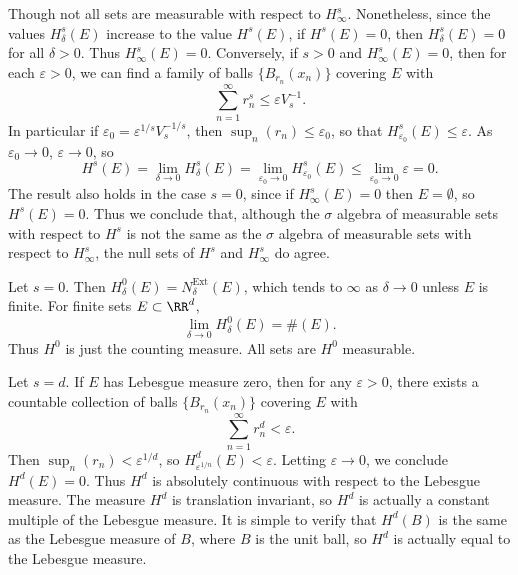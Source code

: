 \begin{remark}
	Though not all sets are measurable with respect to $H^s_\infty$. Nonetheless, since the values $H^s_\delta(E)$ increase to the value $H^s(E)$, if $H^s(E) = 0$, then $H^s_\delta(E) = 0$ for all $\delta > 0$. Thus $H^s_\infty(E) = 0$. Conversely, if $s > 0$ and $H^s_\infty(E) = 0$, then for each $\varepsilon > 0$, we can find a family of balls $\{ B_{r_n}(x_n) \}$ covering $E$ with
	\[ \sum_{n = 1}^\infty r_n^s \leq \varepsilon V_s^{-1}. \]
	In particular if $\varepsilon_0 = \varepsilon^{1/s} V_s^{-1/s}$, then $\sup_n(r_n) \leq \varepsilon_0$, so that $H^s_{\varepsilon_0}(E) \leq \varepsilon$. As $\varepsilon_0 \to 0$, $\varepsilon \to 0$, so
	\[ H^s(E) = \lim_{\delta \to 0} H^s_\delta(E) = \lim_{\varepsilon_0 \to 0} H^s_{\varepsilon_0}(E) \leq \lim_{\varepsilon_0 \to 0} \varepsilon = 0. \]
	The result also holds in the case $s = 0$, since if $H^s_\infty(E) = 0$ then $E = \emptyset$, so $H^s(E) = 0$. Thus we conclude that, although the $\sigma$ algebra of measurable sets with respect to $H^s$ is not the same as the $\sigma$ algebra of measurable sets with respect to $H^s_\infty$, the null sets of $H^s$ and $H^s_\infty$ do agree.
\end{remark}

\begin{example}
	Let $s = 0$. Then $H_\delta^0(E) = N_\delta^{\text{Ext}}(E)$, which tends to $\infty$ as $\delta \to 0$ unless $E$ is finite. For finite sets $E \subset \RR^d$,
	\[ \lim_{\delta \to 0} H_\delta^0(E) = \#(E). \]
	Thus $H^0$ is just the counting measure. All sets are $H^0$ measurable.
\end{example}

\begin{example}
	Let $s = d$. If $E$ has Lebesgue measure zero, then for any $\varepsilon > 0$, there exists a countable collection of balls $\{ B_{r_n}(x_n) \}$ covering $E$ with
	\[ \sum_{n = 1}^\infty r_n^d < \varepsilon. \]
	Then $\sup_n(r_n) < \varepsilon^{1/d}$, so $H^d_{\varepsilon^{1/n}}(E) < \varepsilon$. Letting $\varepsilon \to 0$, we conclude $H^d(E) = 0$. Thus $H^d$ is absolutely continuous with respect to the Lebesgue measure. The measure $H^d$ is translation invariant, so $H^d$ is actually a constant multiple of the Lebesgue measure. It is simple to verify that $H^d(B)$ is the same as the Lebesgue measure of $B$, where $B$ is the unit ball, so $H^d$ is actually equal to the Lebesgue measure.
\end{example}

